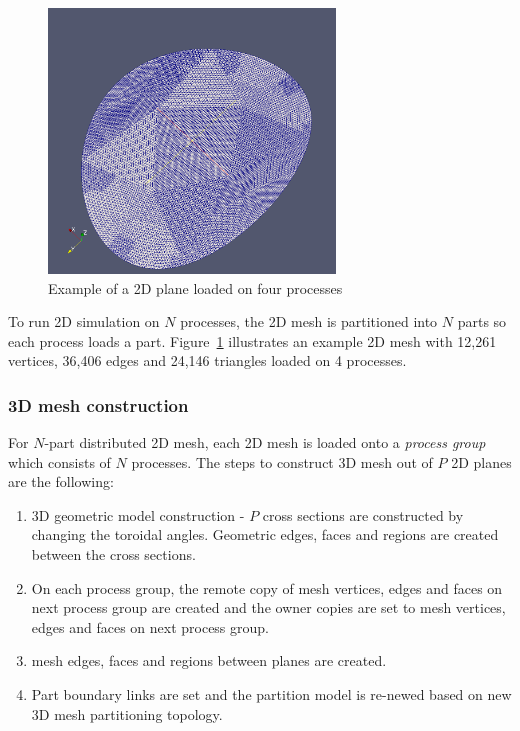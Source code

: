 \documentclass[11pt]{article}  %
\begin{document}
\begin{figure}
\center
\includegraphics[width=3in]{fig/2d.png}
\caption{\small{Example of a 2D plane loaded on four processes}}
\label{fig:2d-plane}
\end{figure}

To run 2D simulation on $N$ processes, the 2D mesh is partitioned into $N$ parts so each process loads a part. Figure~\ref{fig:2d-plane} illustrates an example 2D mesh with 12,261 vertices, 36,406 edges and 24,146 triangles loaded on 4 processes.

\subsubsection{3D mesh construction}
For $N$-part distributed 2D mesh, each 2D mesh is loaded onto a \emph{process group} which consists of $N$ processes. The steps to construct 3D mesh out of $P$ 2D planes are the following:
\begin{enumerate}
\item 3D geometric model construction - $P$ cross sections are constructed by changing the toroidal angles. Geometric edges, faces and regions are created between the cross sections.
\item On each process group, the remote copy of mesh vertices, edges and faces on next process group are created and the owner copies are set to mesh vertices, edges and faces on next process group.
\item mesh edges, faces and regions between planes are created.
\item Part boundary links are set and the partition model is re-newed based on new 3D mesh partitioning topology.
\end{enumerate}
\end{document}
